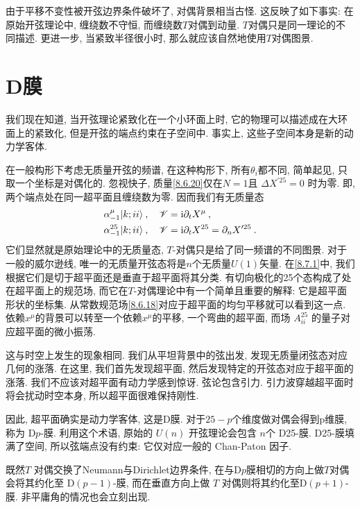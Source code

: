 由于平移不变性被开弦边界条件破坏了, 对偶背景相当古怪. 这反映了如下事实: 在原始开弦理论中, 缠绕数不守恒, 而缠绕数$T$对偶到动量. 
$T$对偶只是同一理论的不同描述. 更进一步, 当紧致半径很小时, 那么就应该自然地使用$T$对偶图景.

\section{D膜}%
我们现在知道, 当开弦理论紧致化在一个小环面上时, 它的物理可以描述成在大环面上的紧致化, 但是开弦的端点约束在子空间中. 事实上, 这些子空间本身是新的动力学客体.

在一般构形下考虑无质量开弦的频谱, 在这种构形下, 所有$\theta_{i}$都不同, 简单起见, 只取一个坐标是对偶化的. 
忽视快子, 质量\eqref{8.6.20}仅在$N=1$且 $\Delta X^{\prime 25}=0 $ 时为零. 即, 两个端点处在同一超平面且缠绕数为零. 因而我们有无质量态
\begin{subequations} \label{8.7.1}
\begin{align}
	&\alpha_{-1}^{\mu}|k; ii\rangle \:, \quad \mathscr{V} = \mathrm{i} \partial_{t} X^{\mu}  \:, \label{8.7.1a} \\
	&\alpha_{-1}^{25} |k; ii\rangle \:, \quad \mathscr{V} = \mathrm{i} \partial_{t} X^{25} = \partial_{n} X^{\prime 25} \:. \label{8.7.1b}
\end{align}
\end{subequations}
它们显然就是原始理论中的无质量态, $T$-对偶只是给了同一频谱的不同图景. 对于一般的威尔逊线, 唯一的无质量开弦态将是$n$个无质量$U(1)$矢量. 
在\eqref{8.7.1}中, 我们根据它们是切于超平面还是垂直于超平面将其分类. 有切向极化的25个态构成了处在超平面上的规范场, 
而它在$T$-对偶理论中有一个简单且重要的解释: 它是超平面形状的坐标集. 从常数规范场\eqref{8.6.18}对应于超平面的均匀平移就可以看到这一点. 
依赖$x^{\mu}$的背景可以转至一个依赖$x^{\mu}$的平移, 一个弯曲的超平面, 而场 $A_{ii}^{25}$ 的量子对应超平面的微小振荡.

这与时空上发生的现象相同. 我们从平坦背景中的弦出发, 发现无质量闭弦态对应几何的涨落. 
在这里, 我们首先发现超平面, 然后发现特定的开弦态对应于超平面的涨落. 我们不应该对超平面有动力学感到惊讶. 
弦论包含引力. 引力波穿越超平面时将会扰动时空本身, 所以超平面很难保持刚性.

因此, 超平面确实是动力学客体, 这是D膜. 对于$25-p$个维度做对偶会得到p维膜, 称为 D$p$-膜. 
利用这个术语, 原始的 $U(n)$ 开弦理论会包含 $n$个 D25-膜. D25-膜填满了空间, 所以弦端点没有约束: 它仅对应一般的 Chan-Paton 因子.

既然$T$ 对偶交换了Neumann与Dirichlet边界条件, 在与D$p$膜相切的方向上做$T$对偶会将其约化至 D$(p{-}1)$-膜, 
而在垂直方向上做 $T$ 对偶则将其约化至D$(p{+}1)$-膜. 非平庸角的情况也会立刻出现. 

